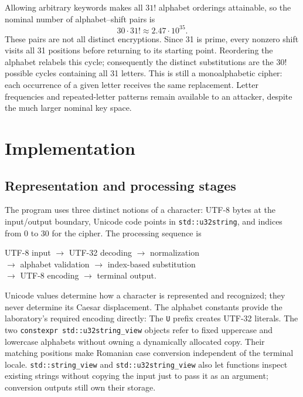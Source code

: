 \documentclass{utmreport}
\newcommand{\sourceexcerpt}[2]{\VerbatimInput[firstline=#1,lastline=#2]{../src/main.cpp}}
\begin{document}
Allowing arbitrary keywords makes all $31!$ alphabet orderings attainable, so the nominal number of alphabet--shift pairs is
\begin{equation}
30\cdot31!\approx2.47\cdot10^{35}.
\end{equation}
These pairs are not all distinct encryptions. Since 31 is prime, every nonzero shift visits all 31 positions before returning to its starting point. Reordering the alphabet relabels this cycle; consequently the distinct substitutions are the $30!$ possible cycles containing all 31 letters. This is still a monoalphabetic cipher: each occurrence of a given letter receives the same replacement. Letter frequencies and repeated-letter patterns remain available to an attacker, despite the much larger nominal key space.

\chapter{Implementation}
\section{Representation and processing stages}
The program uses three distinct notions of a character: UTF-8 bytes at the input/output boundary, Unicode code points in \texttt{std::u32string}, and indices from 0 to 30 for the cipher. The processing sequence is
\begin{center}
\small
UTF-8 input $\longrightarrow$ UTF-32 decoding $\longrightarrow$ normalization\\
$\longrightarrow$ alphabet validation $\longrightarrow$ index-based substitution\\
$\longrightarrow$ UTF-8 encoding $\longrightarrow$ terminal output.
\end{center}
Unicode values determine how a character is represented and recognized; they never determine its Caesar displacement. The alphabet constants provide the laboratory's required encoding directly:
\sourceexcerpt{12}{14}
The \texttt{U} prefix creates UTF-32 literals. The two \texttt{constexpr std::u32string\_view} objects refer to fixed uppercase and lowercase alphabets without owning a dynamically allocated copy. Their matching positions make Romanian case conversion independent of the terminal locale. \texttt{std::string\_view} and \texttt{std::u32string\_view} also let functions inspect existing strings without copying the input just to pass it as an argument; conversion outputs still own their storage.
\end{document}
